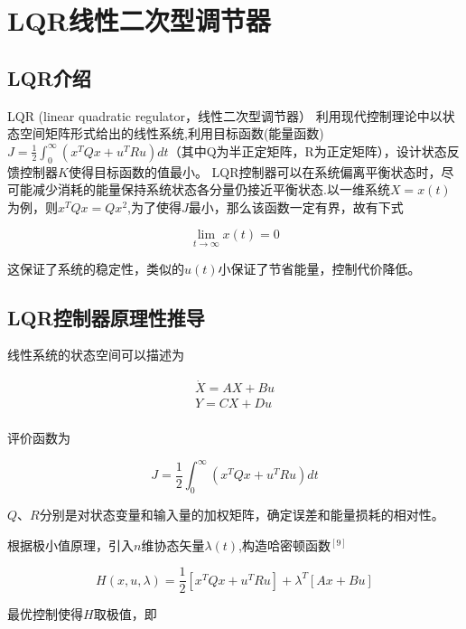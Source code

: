 \chapter{LQR线性二次型调节器}


\section{LQR介绍}

LQR (linear quadratic regulator，线性二次型调节器） 利用现代控制理论中以状态空间矩阵形式给出的线性系统,利用目标函数(能量函数)$J=\frac{1}{2}\int_0^\infty(x^TQx+u^TRu)dt$（其中Q为半正定矩阵，R为正定矩阵），设计状态反馈控制器$K$使得目标函数的值最小。
LQR控制器可以在系统偏离平衡状态时，尽可能减少消耗的能量保持系统状态各分量仍接近平衡状态.以一维系统$X=x(t)$为例，则$x^TQx=Qx^2$,为了使得$J$最小，那么该函数一定有界，故有下式

\begin{equation}
\lim_{t \rightarrow \infty}x(t)=0
\end{equation}

这保证了系统的稳定性，类似的$u(t)$小保证了节省能量，控制代价降低。

\section{LQR控制器原理性推导}

线性系统的状态空间可以描述为
	
\begin{equation}
\begin{aligned}
\dot X=AX+Bu\\
Y=CX+Du\\
\end{aligned}
\end{equation}

评价函数为

\begin{equation}
J=\frac{1}{2}\int_0^\infty(x^TQx+u^TRu)dt
\end{equation}

$Q、R$分别是对状态变量和输入量的加权矩阵，确定误差和能量损耗的相对性。

根据极小值原理，引入$n$维协态矢量$\lambda(t)$,构造哈密顿函数$^{[9]}$

\begin{equation}
H(x,u,\lambda)=\frac{1}{2}[x^TQx+u^TRu]+\lambda^T[Ax+Bu]
\end{equation}

最优控制使得$H$取极值，即


